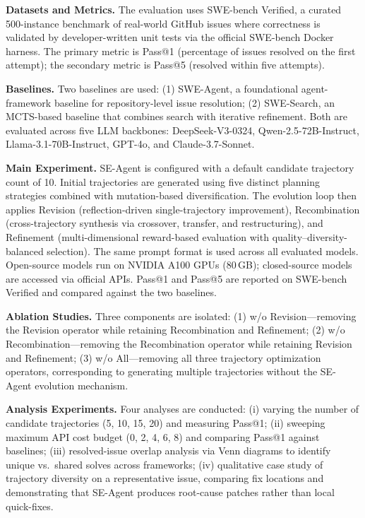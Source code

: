 \begin{tcolorbox}[
	title={Box 11: Case 1 --- Ground Truth Experimental Design Overview},
	colback=blue!3!white,
	colframe=blue!30!black,
	colbacktitle=blue!15!white,
	coltitle=black,
	fonttitle=\bfseries,
	arc=3mm,
	boxrule=0.8pt,
	breakable
]
\small
\textbf{Datasets and Metrics.} The evaluation uses SWE-bench Verified, a curated 500-instance benchmark of real-world GitHub issues where correctness is validated by developer-written unit tests via the official SWE-bench Docker harness. The primary metric is Pass@1 (percentage of issues resolved on the first attempt); the secondary metric is Pass@5 (resolved within five attempts).

\smallskip
\textbf{Baselines.} Two baselines are used: (1) SWE-Agent, a foundational agent-framework baseline for repository-level issue resolution; (2) SWE-Search, an MCTS-based baseline that combines search with iterative refinement. Both are evaluated across five LLM backbones: DeepSeek-V3-0324, Qwen-2.5-72B-Instruct, Llama-3.1-70B-Instruct, GPT-4o, and Claude-3.7-Sonnet.

\smallskip
\textbf{Main Experiment.} SE-Agent is configured with a default candidate trajectory count of 10. Initial trajectories are generated using five distinct planning strategies combined with mutation-based diversification. The evolution loop then applies Revision (reflection-driven single-trajectory improvement), Recombination (cross-trajectory synthesis via crossover, transfer, and restructuring), and Refinement (multi-dimensional reward-based evaluation with quality--diversity-balanced selection). The same prompt format is used across all evaluated models. Open-source models run on NVIDIA A100 GPUs (80\,GB); closed-source models are accessed via official APIs. Pass@1 and Pass@5 are reported on SWE-bench Verified and compared against the two baselines.

\smallskip
\textbf{Ablation Studies.} Three components are isolated: (1) w/o Revision---removing the Revision operator while retaining Recombination and Refinement; (2) w/o Recombination---removing the Recombination operator while retaining Revision and Refinement; (3) w/o All---removing all three trajectory optimization operators, corresponding to generating multiple trajectories without the SE-Agent evolution mechanism.

\smallskip
\textbf{Analysis Experiments.} Four analyses are conducted: (i) varying the number of candidate trajectories (5, 10, 15, 20) and measuring Pass@1; (ii) sweeping maximum API cost budget (0, 2, 4, 6, 8) and comparing Pass@1 against baselines; (iii) resolved-issue overlap analysis via Venn diagrams to identify unique vs.\ shared solves across frameworks; (iv) qualitative case study of trajectory diversity on a representative issue, comparing fix locations and demonstrating that SE-Agent produces root-cause patches rather than local quick-fixes.
\end{tcolorbox}

